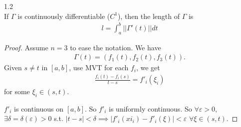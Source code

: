 \documentclass[a4paper]{article}
\begin{document}
\begin{prop} 1.2 \label{th1.2}\\
If $\Gamma$ is continuously differentiable ($C^1$), then the length of $\Gamma$ is
\begin{equation*}
\begin{aligned}
l = \int_a^b ||\Gamma'(t)||dt
\end{aligned}
\end{equation*}
\begin{proof}
Assume $n=3$ to ease the notation. We have
\begin{equation*}
\begin{aligned}
\Gamma(t) = (f_1(t),f_2(t),f_3(t)).
\end{aligned}
\end{equation*}
Given $s \neq t$ in $[a,b]$, use MVT for each $f_i$, we get
\begin{equation*}
\begin{aligned}
\frac{f_i(t)-f_i(s)}{t-s} = f'_i(\xi_i)
\end{aligned}
\end{equation*}
for some $\xi_i \in (s,t)$.

$f'_i$ is continuous on $[a,b]$. So $f'_i$ is uniformly continuous. So $\forall \varepsilon>0$, $\exists \delta = \delta(\varepsilon)>0$ s.t. $|t-s| < \delta \implies |f'_i(xi_i) - f'_i(\xi)| < \varepsilon$ $\forall \xi \in (s,t)$.


\end{proof}
\end{prop}
\end{document}
